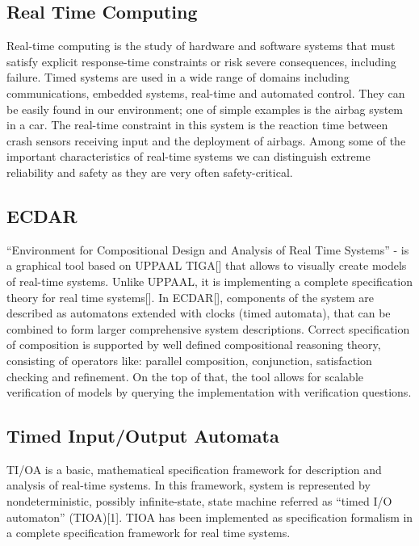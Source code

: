 
\subsection {Real Time Computing}
%
Real-time computing is the study of hardware and software systems that must satisfy explicit 
response-time constraints or risk severe consequences, including failure. Timed systems are 
used in a wide range of domains including communications, embedded systems, real-time and automated control. 
They can be easily found in our environment; one of simple examples is the airbag system in a car. 
The real-time constraint in this system is the reaction time between crash sensors receiving input and 
the deployment of airbags. Among some of the important characteristics of real-time systems we can distinguish 
extreme reliability and safety as they are very often safety-critical.    

\subsection{ECDAR \label{background-ecdar}}
%
“Environment for Compositional Design and Analysis of Real Time Systems” - is a graphical tool based on UPPAAL TIGA[] that 
allows to visually create models of real-time systems. Unlike UPPAAL, it is implementing a complete specification theory for 
real time systems[]. In ECDAR[], components of the system are described as automatons extended with clocks (timed automata), 
that can be combined to form larger comprehensive system descriptions. Correct specification of composition is supported by 
well defined compositional reasoning theory, consisting of operators like: parallel composition, conjunction, satisfaction 
checking and refinement. On the top of that, the tool allows for scalable verification of models by querying the 
implementation with verification questions. 
%

\subsection{Timed Input/Output Automata \label{background-tioa}}
%
TI/OA is a basic, mathematical specification framework for description and analysis of real-time systems. 
In this framework, system is represented by nondeterministic, possibly infinite-state, state machine referred 
as “timed I/O automaton” (TIOA)[1]. TIOA has been implemented as specification formalism in a complete 
specification framework for real time systems.

